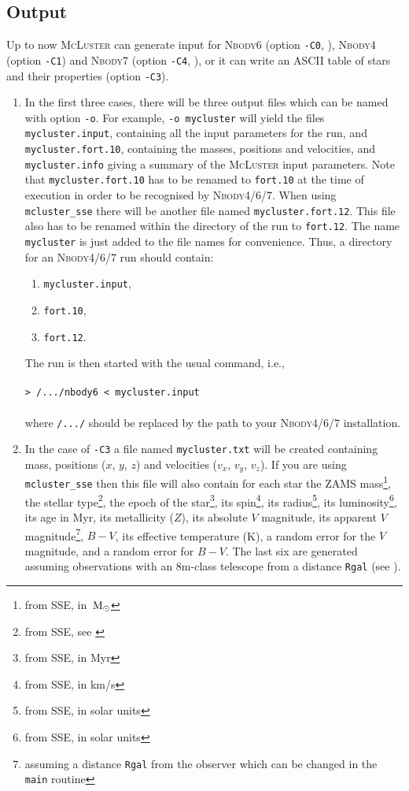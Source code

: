 \documentclass[useAMS,usenatbib]{mn2e}
\newcommand{\msun}{\mbox{$\,{\rm M}_\odot$}}
\begin{document}
\subsection*{Output}
Up to now \textsc{McLuster} can generate input for \textsc{Nbody6} (option \texttt{-C0}, \citealt{Aarseth03, Nitadori12}), \textsc{Nbody4} (option \texttt{-C1}) and  \textsc{Nbody7} (option \texttt{-C4}, \citealt{Aarseth12}), or it can write an ASCII table of stars and their properties (option \texttt{-C3}). 
\begin{enumerate}
\item In the first three cases, there will be three output files which can be named with option \texttt{-o}. For example, \texttt{-o mycluster} will yield the files \texttt{mycluster.input}, containing all the input parameters for the run, and \texttt{mycluster.fort.10}, containing the masses, positions and velocities, and  \texttt{mycluster.info} giving a summary of the \textsc{McLuster} input parameters. Note that  \texttt{mycluster.fort.10} has to be renamed to \texttt{fort.10} at the time of execution in order to be recognised by \textsc{Nbody4/6/7}. When using \texttt{mcluster\_sse} there will be another file named \texttt{mycluster.fort.12}. This file also has to be renamed within the directory of the run to \texttt{fort.12}. The name \texttt{mycluster} is just added to the file names for convenience. Thus, a directory for an  \textsc{Nbody4/6/7} run should contain:
\begin{enumerate}
\item \texttt{mycluster.input},
\item \texttt{fort.10},
\item \texttt{fort.12}.
\end{enumerate}
The run is then started with the usual command, i.e., \\\\
\texttt{> /.../nbody6 < mycluster.input}\\\\
where \texttt{/.../} should be replaced by the path to your \textsc{Nbody4/6/7} installation. 
\item In the case of \texttt{-C3} a file named \texttt{mycluster.txt} will be created containing mass, positions ($x$, $y$, $z$) and velocities ($v_x$, $v_y$, $v_z$). If you are using \texttt{mcluster\_sse} then this file will also contain for each star the ZAMS mass\footnote{from \textsc{SSE}, in $\msun$}, the stellar type\footnote{from \textsc{SSE}, see \citealt{Hurley00}}, the epoch of the star\footnote{from \textsc{SSE}, in Myr}, its spin\footnote{from \textsc{SSE}, in km/s}, its radius\footnote{from \textsc{SSE}, in solar units}, its luminosity\footnote{from \textsc{SSE}, in solar units}, its age  in Myr, its metallicity ($Z$), its absolute $V$ magnitude, its apparent $V$ magnitude\footnote{assuming a distance \texttt{Rgal} from the observer which can be changed in the \texttt{main} routine}, $B-V$, its effective temperature (K), a random error for the $V$ magnitude, and a random error for $B-V$. The last six are generated assuming observations with an 8m-class telescope from a distance \texttt{Rgal} (see \citealt{Kuepper11}). 
\end{enumerate}
\end{document}
